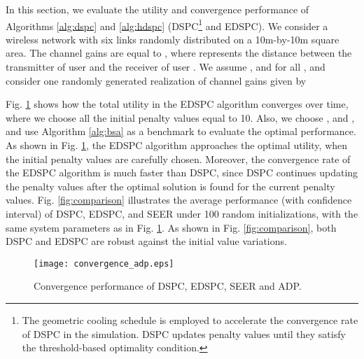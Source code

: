 \documentclass[10pt,journal,letterpaper,compsoc]{IEEEtran}
\begin{document}
{{In this section, we evaluate the utility and convergence performance of Algorithms \ref{alg:dspc} and \ref{alg:hdspc} (DSPC\footnote{The geometric cooling schedule is employed to accelerate the convergence rate of DSPC in the simulation. DSPC updates penalty values until they satisfy the threshold-based optimality condition.} and EDSPC). We consider a wireless network with six links randomly distributed on a 10m-by-10m square area. The channel gains  are equal to , where  represents the distance between the transmitter of user  and the receiver of user . We assume  ,  and  for all , and consider one randomly generated realization of channel gains given by

\vspace{-0.25cm}
\begin{small}

\end{small}



Fig. \ref{fig:convergence} shows how the total utility in the EDSPC algorithm converges over time, where we choose all the initial penalty values equal to 10. Also, we choose ,  and , and use Algorithm \ref{alg:bsa} as a benchmark to evaluate the optimal performance. As shown in Fig. \ref{fig:convergence}, the EDSPC algorithm  approaches the optimal utility, when the initial penalty values are carefully chosen. Moreover, the convergence rate of the EDSPC algorithm is much faster than DSPC, since DSPC continues updating the penalty values after the optimal solution is found for the current penalty values. Fig. \ref{fig:comparison} illustrates the average performance (with confidence interval) of DSPC, EDSPC, and SEER under 100 random initializations, with the same system parameters as in Fig. \ref{fig:convergence}. As shown in Fig. \ref{fig:comparison}, both DSPC and EDSPC are robust against the initial value variations.

\begin{figure}[t]
\begin{center}
\vspace{-0.0cm}\hspace{-0.0cm} {\texttt{[image: convergence\_adp.eps]}}\hspace{-0.0cm}
\vspace{0cm} \caption{Convergence performance of DSPC, EDSPC, SEER and ADP.}\vspace{-0.0cm}
\label{fig:convergence}
\end{center}
\end{figure}

}}
\end{document}
